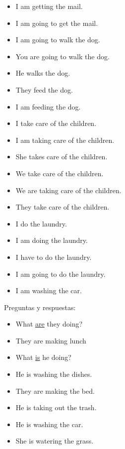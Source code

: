 \begin{itemize}
	\item {} \arr I am getting the mail.
	\item {} \arr I am going to get the mail.
	\item {} \arr I am going to walk the dog.
	\item {} \arr You are going to walk the dog.
	\item {} \arr He walks the dog.
	\item {} \arr They feed the dog.
	\item {} \arr I am feeding the dog.
	\item {} \arr I take care of the children.
	\item {} \arr I am taking care of the children.
	\item {} \arr She takes care of the children.
	\item {} \arr We take care of the children.
	\item {} \arr We are taking care of the children.
	\item {} \arr They take care of the children.
	\item {} \arr I do the laundry.
	\item {} \arr I am doing the laundry.
	\item {} \arr I have to do the laundry.
	\item {} \arr I am going to do the laundry.
	\item {} \arr I am washing the car.
\end{itemize}

Preguntas y respuestas:
\begin{itemize}
	\item What \underline{are} they doing? \arr {}
	\item They are making lunch \arr {}
	\item What \underline{is} he doing? \arr {}
	\item He is washing the dishes. \arr {}
	\item They are making the bed. \arr {}
	\item He is taking out the trash. \arr {}
	\item He is washing the car. \arr {}
	\item She is watering the grass. \arr {}
\end{itemize}

